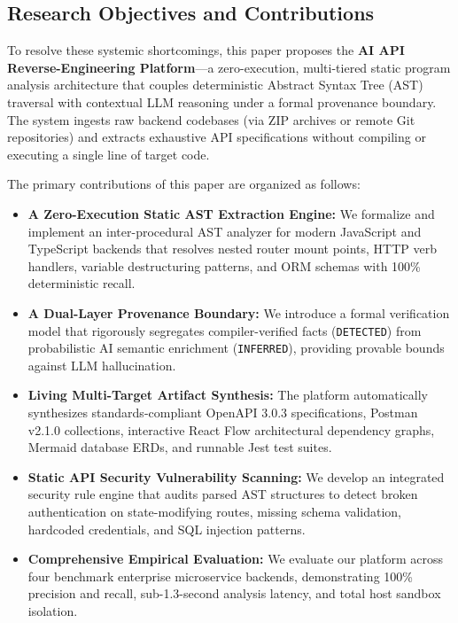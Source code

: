 \documentclass[a4paper,10pt]{article}
\begin{document}
\subsection{Research Objectives and Contributions}
\noindent
To resolve these systemic shortcomings, this paper proposes the \textbf{AI API Reverse-Engineering Platform}---a zero-execution, multi-tiered static program analysis architecture that couples deterministic Abstract Syntax Tree (AST) traversal with contextual LLM reasoning under a formal provenance boundary. The system ingests raw backend codebases (via ZIP archives or remote Git repositories) and extracts exhaustive API specifications without compiling or executing a single line of target code.

The primary contributions of this paper are organized as follows:
\begin{itemize}
  \setlength{\itemsep}{1pt}
  \item \textbf{A Zero-Execution Static AST Extraction Engine:} We formalize and implement an inter-procedural AST analyzer for modern JavaScript and TypeScript backends that resolves nested router mount points, HTTP verb handlers, variable destructuring patterns, and ORM schemas with 100\% deterministic recall.
  \item \textbf{A Dual-Layer Provenance Boundary:} We introduce a formal verification model that rigorously segregates compiler-verified facts (\texttt{DETECTED}) from probabilistic AI semantic enrichment (\texttt{INFERRED}), providing provable bounds against LLM hallucination.
  \item \textbf{Living Multi-Target Artifact Synthesis:} The platform automatically synthesizes standards-compliant OpenAPI 3.0.3 specifications, Postman v2.1.0 collections, interactive React Flow architectural dependency graphs, Mermaid database ERDs, and runnable Jest test suites.
  \item \textbf{Static API Security Vulnerability Scanning:} We develop an integrated security rule engine that audits parsed AST structures to detect broken authentication on state-modifying routes, missing schema validation, hardcoded credentials, and SQL injection patterns.
  \item \textbf{Comprehensive Empirical Evaluation:} We evaluate our platform across four benchmark enterprise microservice backends, demonstrating 100\% precision and recall, sub-1.3-second analysis latency, and total host sandbox isolation.
\end{itemize}
\end{document}
